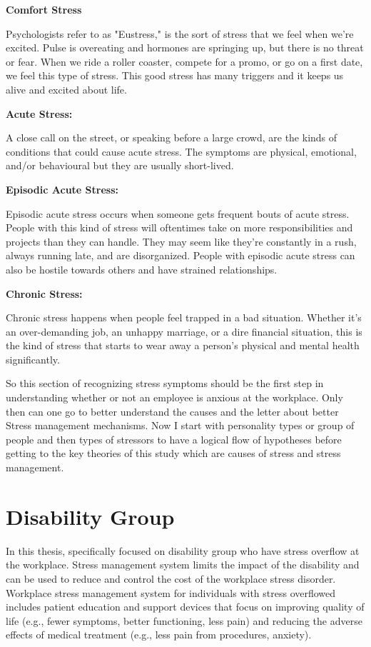 \textbf{Comfort Stress}

Psychologists refer to as "Eustress," is the sort of stress that we feel when we're excited. Pulse is overeating and hormones are springing up, but there is no threat or fear. When we ride a roller coaster, compete for a promo, or go on a first date, we feel this type of stress. This good stress has many triggers and it keeps us alive and excited about life.

\textbf{Acute Stress: }

A close call on the street, or speaking before a large crowd, are the kinds of conditions that could cause acute stress. The symptoms are physical, emotional, and/or behavioural but they are usually short-lived.

\textbf{Episodic Acute Stress: }

Episodic acute stress occurs when someone gets frequent bouts of acute stress. People with this kind of stress will oftentimes take on more responsibilities and projects than they can handle. They may seem like they’re constantly in a rush, always running late, and are disorganized. People with episodic acute stress can also be hostile towards others and have strained relationships.

\textbf{Chronic Stress: }

Chronic stress happens when people feel trapped in a bad situation. Whether it's an over-demanding job, an unhappy marriage, or a dire financial situation, this is the kind of stress that starts to wear away a person's physical and mental health significantly.\citep{Cottini2013MentalEurope}

So this section of recognizing stress symptoms should be the first step in understanding whether or not an employee is anxious at the workplace.  Only then can one go to better understand the causes and the letter about better Stress management mechanisms. Now I start with personality types or group of people and then types of stressors to have a logical flow of hypotheses before getting to the key theories of this study which are causes of stress and stress management.

\section{Disability Group}
In this thesis, specifically focused on disability group who have stress overflow at the workplace. Stress management system limits the impact of the disability and can be used to reduce and control the cost of the workplace stress disorder. Workplace stress management system for individuals with stress overflowed includes patient education and support devices that focus on improving quality of life (e.g., fewer symptoms, better functioning, less pain) and reducing the adverse effects of medical treatment (e.g., less pain from procedures, anxiety).\citep{Jones2003StressJapan}
